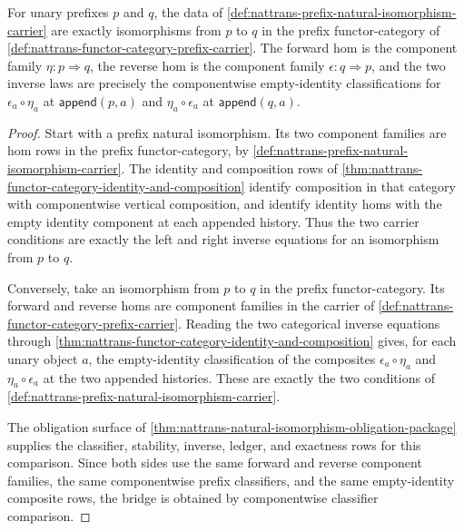 \begin{theorem}
\label{thm:nattrans-prefix-natural-isomorphism-functor-category-isomorphism}
For unary prefixes $p$ and $q$, the data of
\autoref{def:nattrans-prefix-natural-isomorphism-carrier} are exactly
isomorphisms from $p$ to $q$ in the prefix functor-category of
\autoref{def:nattrans-functor-category-prefix-carrier}. The forward hom is
the component family $\eta:p\Rightarrow q$, the reverse hom is the component
family $\epsilon:q\Rightarrow p$, and the two inverse laws are precisely the
componentwise empty-identity classifications for
$\epsilon_a \circ \eta_a$ at $\mathsf{append}(p,a)$ and
$\eta_a \circ \epsilon_a$ at $\mathsf{append}(q,a)$.
\end{theorem}
\begin{proof}
Start with a prefix natural isomorphism. Its two component families are hom
rows in the prefix functor-category, by
\autoref{def:nattrans-prefix-natural-isomorphism-carrier}. The identity and
composition rows of
\autoref{thm:nattrans-functor-category-identity-and-composition} identify
composition in that category with componentwise vertical composition, and
identify identity homs with the empty identity component at each appended
history. Thus the two carrier conditions are exactly the left and right
inverse equations for an isomorphism from $p$ to $q$.

Conversely, take an isomorphism from $p$ to $q$ in the prefix functor-category.
Its forward and reverse homs are component families in the carrier of
\autoref{def:nattrans-functor-category-prefix-carrier}. Reading the two
categorical inverse equations through
\autoref{thm:nattrans-functor-category-identity-and-composition} gives, for
each unary object $a$, the empty-identity classification of the composites
$\epsilon_a \circ \eta_a$ and $\eta_a \circ \epsilon_a$ at the two appended
histories. These are exactly the two conditions of
\autoref{def:nattrans-prefix-natural-isomorphism-carrier}.

The obligation surface of
\autoref{thm:nattrans-natural-isomorphism-obligation-package} supplies the
classifier, stability, inverse, ledger, and exactness rows for this comparison.
Since both sides use the same forward and reverse component families, the same
componentwise prefix classifiers, and the same empty-identity composite rows,
the bridge is obtained by componentwise classifier comparison.
\end{proof}


